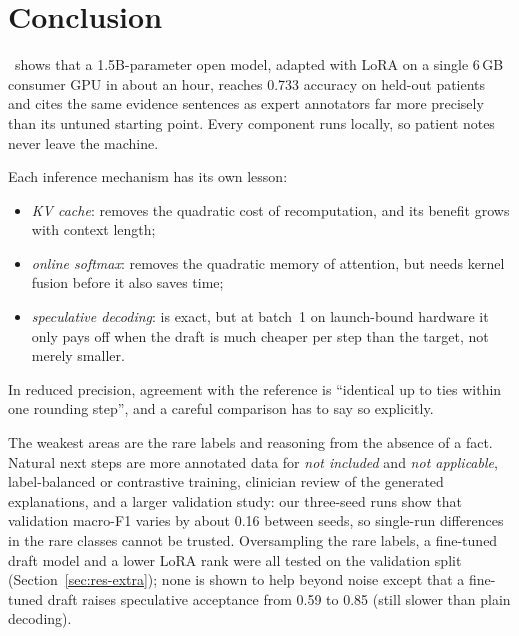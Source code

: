 \section{Conclusion}\label{sec:conclusion}
\sys\ shows that a 1.5B-parameter open model, adapted with LoRA on a single 6\,GB consumer GPU in about an
hour, reaches 0.733 accuracy on held-out patients and cites the same evidence sentences as expert annotators
far more precisely than its untuned starting point. Every component runs locally, so patient notes never leave
the machine.

Each inference mechanism has its own lesson:
\begin{itemize}
\item \emph{KV cache}: removes the quadratic cost of recomputation, and its benefit grows with context length;
\item \emph{online softmax}: removes the quadratic memory of attention, but needs kernel fusion before it also
saves time;
\item \emph{speculative decoding}: is exact, but at batch~1 on launch-bound hardware it only pays off when the
draft is much cheaper per step than the target, not merely smaller.
\end{itemize}
In reduced precision, agreement with the reference is ``identical up to ties within one rounding step'', and a
careful comparison has to say so explicitly.

The weakest areas are the rare labels and reasoning from the absence of a fact. Natural next steps are more
annotated data for \emph{not included} and \emph{not applicable}, label-balanced or contrastive training,
clinician review of the generated explanations, and a larger validation study: our three-seed runs show that
validation macro-F1 varies by about 0.16 between seeds, so single-run differences in the rare classes cannot be
trusted. Oversampling the rare labels, a fine-tuned draft model and a lower LoRA rank were all tested on the
validation split (Section~\ref{sec:res-extra}); none is shown to help beyond noise except that a fine-tuned
draft raises speculative acceptance from 0.59 to 0.85 (still slower than plain decoding).

